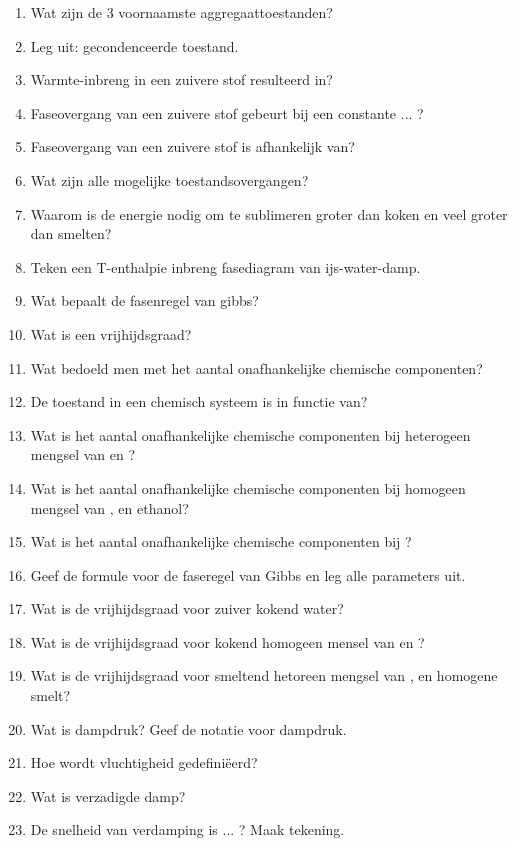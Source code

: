 \documentclass[a4paper,12pt]{article}
\begin{document}
    \begin{enumerate}
        \item Wat zijn de 3 voornaamste aggregaattoestanden?
        \item Leg uit: gecondenceerde toestand.
        \item Warmte-inbreng in een zuivere stof resulteerd in?
        \item Faseovergang van een zuivere stof gebeurt bij een constante ... ? 
        \item Faseovergang van een zuivere stof is afhankelijk van?
        \item Wat zijn alle mogelijke toestandsovergangen?
        \item Waarom is de energie nodig om te sublimeren groter dan koken en veel groter dan smelten?
        \item Teken een T-enthalpie inbreng fasediagram van ijs-water-damp.
        \item Wat bepaalt de fasenregel van gibbs?
        \item Wat is een vrijhijdsgraad?
        \item Wat bedoeld men met het aantal onafhankelijke chemische componenten?
        \item De toestand in een chemisch systeem is in functie van?
        \item Wat is het aantal onafhankelijke chemische componenten bij heterogeen mengsel van  en ?
        \item Wat is het aantal onafhankelijke chemische componenten bij homogeen mengsel van , en ethanol?
        \item Wat is het aantal onafhankelijke chemische componenten bij ?
        \item Geef de formule voor de faseregel van Gibbs en leg alle parameters uit.
        \item Wat is de vrijhijdsgraad voor zuiver kokend water?
        \item Wat is de vrijhijdsgraad voor kokend homogeen mensel van  en ?
        \item Wat is de vrijhijdsgraad voor smeltend hetoreen mengsel van  ,  en homogene smelt?
        \item Wat is dampdruk? Geef de notatie voor dampdruk.
        \item Hoe wordt vluchtigheid gedefini\"eerd?
        \item Wat is verzadigde damp?
        \item De snelheid van verdamping is ... ? Maak tekening.

\end{enumerate}
\end{document}
